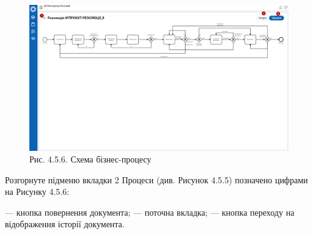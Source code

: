 \begin{figure}[!htbp]
\centerline{\includegraphics[width=\textwidth]{img/4.5.6.png}}
\caption{Рис. 4.5.6. Схема бізнес-процесу}
\end{figure}

Розгорнуте підменю вкладки 2 Процеси (див. Рисунок 4.5.5) позначено цифрами на Рисунку 4.5.6:

 --- кнопка повернення документа;
 --- поточна вкладка;
 --- кнопка переходу на відображення історії документа.

